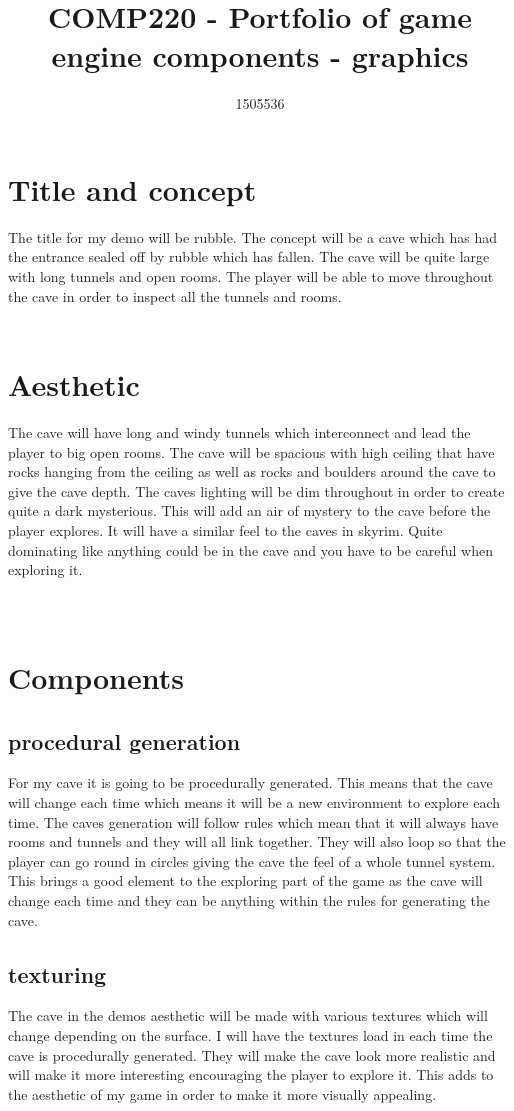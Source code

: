 \documentclass{scrartcl}
\title{COMP220 - Portfolio of game engine components - graphics}
\author{1505536}
\begin{document}
\maketitle

\section{Title and concept }
The title for my demo will be rubble. The concept will be a cave which has had the entrance sealed off by rubble which has fallen. The cave will be quite large with long tunnels and open rooms. The player will be able to move throughout the cave in order to inspect all the tunnels and rooms.
\\
\\
\section{Aesthetic}
The cave will have long and windy tunnels which interconnect and lead the player to big open rooms. The cave will be spacious with high ceiling that have rocks hanging from the ceiling as well as rocks and boulders around the cave to give the cave depth. The caves lighting will be dim throughout in order to create quite a dark mysterious. This will add an air of mystery to the cave before the player explores. It will have a similar feel to the caves in skyrim. Quite dominating like anything could be in the cave and you have to be careful when exploring it.
\\
\\
\\
\section{Components}
\subsection{procedural generation}
For my cave it is going to be procedurally generated. This means that the cave will change each time which means it will be a new environment to explore each time. The caves generation will follow rules which mean that it will always have rooms and tunnels and they will all link together. They will also loop so that the player can go round in circles giving the cave the feel of a whole tunnel system. This brings a good element to the exploring part of the game as the cave will change each time and they can be anything within the rules for generating the cave.
\subsection{texturing}
The cave in the demos aesthetic will be made with various textures which will change depending on the surface. I will have the textures load in each time the cave is procedurally generated. They will make the cave look more realistic and will make it  more interesting encouraging the player to explore it. This adds to the aesthetic of my game in order to make it more visually appealing.
\end{document}
